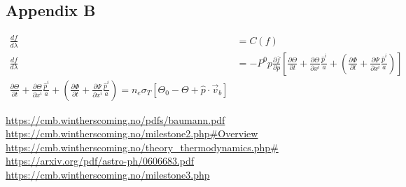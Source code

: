 \documentclass{aa}
\begin{document}
\subsection{Appendix B}
\label{B_A}
\begin{align}
    \frac{df}{d\lambda} &=C(f)\\
    \frac{df}{d\lambda} &= -P^0p\frac{\partial \overline{f}}{\partial p}\left[\frac{\partial \Theta}{\partial t} + \frac{\partial \Theta}{\partial x^i} \frac{\hat{p}^i}{a} + (\frac{\partial \Phi}{\partial t} + \frac{\partial \Psi}{\partial x^i}\frac{\hat{p}^i}{a})\right]\\
    \frac{\partial \Theta}{\partial t} + \frac{\partial \Theta}{\partial x^i} \frac{\hat{p}^i}{a} + (\frac{\partial \Phi}{\partial t} + \frac{\partial \Psi}{\partial x^i}\frac{\hat{p}^i}{a}) = n_e \sigma_T[\Theta_0 - \Theta + \hat{p}\cdot \vec{v}_b]
\end{align}
\clearpage
\begin{thebibliography}{}

  \url{https://cmb.wintherscoming.no/pdfs/baumann.pdf}\\

   \url{https://cmb.wintherscoming.no/milestone2.php#Overview}\\

   \url{https://cmb.wintherscoming.no/theory_thermodynamics.php#}\\
   \url{https://arxiv.org/pdf/astro-ph/0606683.pdf} \label{Callin}\\
   \url{https://cmb.wintherscoming.no/milestone3.php}\label{M3}
\end{thebibliography}
\end{document}
